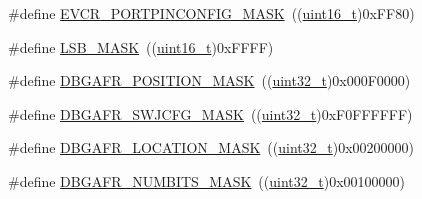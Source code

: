 \begin{DoxyCompactItemize}
\item 
\#define \hyperlink{group___g_p_i_o___private___defines_ga97d20e77a588a767e1a775dd4299d1c5}{E\+V\+C\+R\+\_\+\+P\+O\+R\+T\+P\+I\+N\+C\+O\+N\+F\+I\+G\+\_\+\+M\+A\+SK}~((\hyperlink{_p_e___types_8h_a1f1825b69244eb3ad2c7165ddc99c956}{uint16\+\_\+t})0x\+F\+F80)
\item 
\#define \hyperlink{group___g_p_i_o___private___defines_ga338d54179ac0da2af2363e3a930bf374}{L\+S\+B\+\_\+\+M\+A\+SK}~((\hyperlink{_p_e___types_8h_a1f1825b69244eb3ad2c7165ddc99c956}{uint16\+\_\+t})0x\+F\+F\+F\+F)
\item 
\#define \hyperlink{group___g_p_i_o___private___defines_gafa4eba58b1839413acb4591da00e7559}{D\+B\+G\+A\+F\+R\+\_\+\+P\+O\+S\+I\+T\+I\+O\+N\+\_\+\+M\+A\+SK}~((\hyperlink{_p_e___types_8h_a33594304e786b158f3fb30289278f5af}{uint32\+\_\+t})0x000\+F0000)
\item 
\#define \hyperlink{group___g_p_i_o___private___defines_ga47a1cd3c0505a7be3e161671237d8460}{D\+B\+G\+A\+F\+R\+\_\+\+S\+W\+J\+C\+F\+G\+\_\+\+M\+A\+SK}~((\hyperlink{_p_e___types_8h_a33594304e786b158f3fb30289278f5af}{uint32\+\_\+t})0x\+F0\+F\+F\+F\+F\+F\+F)
\item 
\#define \hyperlink{group___g_p_i_o___private___defines_gaab83406f875057e96458940ca9519b7d}{D\+B\+G\+A\+F\+R\+\_\+\+L\+O\+C\+A\+T\+I\+O\+N\+\_\+\+M\+A\+SK}~((\hyperlink{_p_e___types_8h_a33594304e786b158f3fb30289278f5af}{uint32\+\_\+t})0x00200000)
\item 
\#define \hyperlink{group___g_p_i_o___private___defines_gaea2fa480dea4d6e061eaa1417a9196dc}{D\+B\+G\+A\+F\+R\+\_\+\+N\+U\+M\+B\+I\+T\+S\+\_\+\+M\+A\+SK}~((\hyperlink{_p_e___types_8h_a33594304e786b158f3fb30289278f5af}{uint32\+\_\+t})0x00100000)
\end{DoxyCompactItemize}
